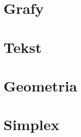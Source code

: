\documentclass{article}
\begin{document}
\section{Grafy}

\newpage
\section{Tekst}

\newpage
\section{Geometria}

\newpage
\section{Simplex}

\end{document}

